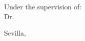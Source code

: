 \begin{center}
\begin{spacing}{1.3}
\textbf{\Large {\thesisAuthor}}\\
{\large {\priorstudies}}\\
\end{spacing}
\end{center}

\vspace{5 mm}
\begin{center}
\begin{spacing}{1.3}
{Under the supervision of:}\\
    {\large {Dr. \supervisor}}\\
    {\large {\cosupervisor}}
\end{spacing}
\end{center}

\vspace{15 mm}
\begin{center}
    \large {Sevilla, \thesisDate}
\end{center}

